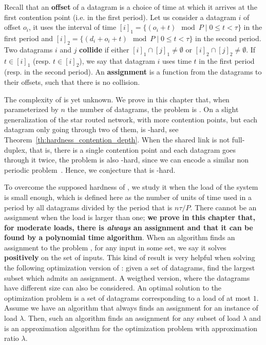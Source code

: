  Recall that an \textbf{offset} of a datagram is a choice of time at which it arrives
 at the first contention point (i.e. in the first period). Let us consider a datagram $i$
 of offset $o_i$, it uses the interval of time $[i]_1 = \{ (o_i + t) \mod P \mid 0 \leq t < \tau \}$ in the first period and $[i]_2 = \{ (d_i + o_i + t) \mod P \mid 0 \leq t < \tau \}$ in the second period. Two datagrams $i$ and $j$ \textbf{collide} if either $[i]_1 \cap [j]_1 \neq \emptyset $ or $[i]_2 \cap [j]_2 \neq \emptyset $. If $t \in [i]_1$ (resp. $t \in [i]_2$), we say that datagram $i$ uses time $t$ in the first period (resp. in the second period). An \textbf{assignment} is a function from the datagrams to their offsets, such that there is no collision.

The complexity of \pma is yet unknown. We prove in this chapter that, when parameterized by
$n$ the number of datagrams, the problem is \FPT. On a slight generalization of the star routed network, with more contention points, but each datagram only going through two of them, \pazl is \NP-hard, see Theorem~\ref{th:hardness_contention_depth}. When the shared link is not full-duplex, that is, there is a single contention point and each datagram goes through it twice, the problem is also \NP-hard, since we can encode a similar non periodic problem~\cite{orman1997complexity}. Hence, we conjecture that \pma is \NP-hard.

To overcome the supposed hardness of \pma, we study it when the load of the system is small enough, which is defined here as
the number of units of time used in a period by all datagrams divided by the period that is $n\tau /P$. There cannot be an assignment when the load is larger than one; \textbf{we prove in this chapter that, for moderate loads, there is \emph{always} an assignment and that it can be found by a polynomial time algorithm}. When an algorithm finds an assignment to the problem \pma, for any input in some set, we say it solves \pma \textbf{positively} on the set of inputs. This kind of result is very helpful when solving the following optimization version of \pma: given a set of datagrams, find the largest subset which admits an assignment. A weigthed version, where the datagrams have different size can also be considered. An optimal solution to the optimization problem is a set of datagrams corresponding to a load of at most $1$. Assume we have an algorithm that always finds an assignment for an instance of load $\lambda$. Then, such an algorithm finds an assignment for any subset of load $\lambda$ and is an approximation algorithm for the optimization problem with approximation ratio $\lambda$.

